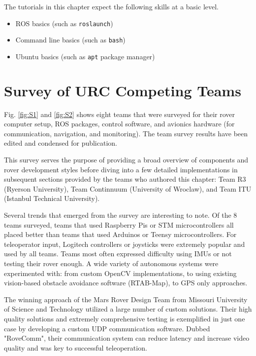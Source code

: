 \documentclass[runningheads,a4paper]{llncs}
\begin{document}
The tutorials in this chapter expect the following skills at a basic level.

\begin{itemize}
\item ROS basics (such as \texttt{roslaunch})
\item Command line basics (such as \texttt{bash})
\item Ubuntu basics (such as \texttt{apt} package manager)
\end{itemize}

\section{Survey of URC Competing Teams}\label{survey}

Fig. \ref{fig:S1} and \ref{fig:S2}  shows eight teams that were surveyed for their rover computer setup, ROS packages, control software, and avionics hardware (for communication, navigation, and monitoring). The team survey results have been edited and condensed for publication.

This survey serves the purpose of providing a broad overview of components and rover development styles before diving into a few detailed implementations in subsequent sections provided by the teams who authored this chapter: Team R3 (Ryerson University), Team Continnuum (University of Wroclaw), and Team ITU (Istanbul Technical University).

Several trends that emerged from the survey are interesting to note. Of the 8 teams surveyed, teams that used Raspberry Pis or STM microcontrollers all placed better than teams that used Arduinos or Teensy microcontrollers. For teleoperator input, Logitech controllers or joysticks were extremely popular and used by all teams. Teams most often expressed difficulty using IMUs or not testing their rover enough. A wide variety of autonomous systems were experimented with: from custom OpenCV implementations, to using existing vision-based obstacle avoidance software (RTAB-Map), to GPS only approaches.

The winning approach of the Mars Rover Design Team from Missouri University of Science and Technology utilized a large number of custom solutions. Their high quality solutions and extremely comprehensive testing is exemplified in just one case by developing a custom UDP communication software. Dubbed "RoveComm", their communication system can reduce latency and increase video quality and was key to successful teleoperation.
\end{document}
